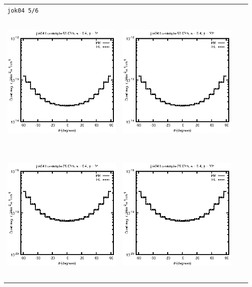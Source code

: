 \documentclass[10pt,a4paper]{article}
\begin{document}
\begin{adjustwidth}{-1.2in}{-1.2in}
\begin{tabular}{c c c c}
\multicolumn{4}{l}{\texttt{jok04 5/6}} \\
\includegraphics[height=7cm]{../eps/jok04_Lu_sample_50.00m_fwd.eps} &
\includegraphics[height=7cm]{../eps/jok04_Lu_sample_50.00m_cross.eps} \\
\includegraphics[height=7cm]{../eps/jok04_Lu_sample_75.00m_fwd.eps} &
\includegraphics[height=7cm]{../eps/jok04_Lu_sample_75.00m_cross.eps} \\

\end{tabular}
\end{adjustwidth}
\end{document}
